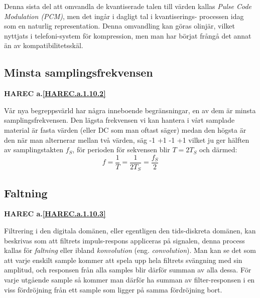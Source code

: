 Denna sista del att omvandla de kvantiserade talen till värden kallas
\emph{Pulse Code Modulation (PCM)}, men det ingår i dagligt tal i kvantiserings-
processen idag som en naturlig representation.
Denna omvandling kan göras olinjär, vilket nyttjats i telefoni-system för
kompression, men man har börjat frångå det annat än av kompatibilitetsskäl.

\subsection{Minsta samplingsfrekvensen}
\textbf{HAREC a.\ref{HAREC.a.1.10.2}\label{myHAREC.a.1.10.2}}


Vår nya begreppsvärld har några inneboende begränsningar, en av dem är minsta
samplingsfrekvensen.
Den lägsta frekvensen vi kan hantera i vårt samplade material är fasta värden
(eller DC som man oftast säger) medan den högsta är den när man alternerar
mellan två värden, säg -1 +1 -1 +1 vilket ju ger hälften av samplingstakten
\(f_S\), för perioden för sekvensen blir \(T = 2T_S\) och därmed:
\[
f=\frac{1}{T}=\frac{1}{2T_S}=\frac{f_S}{2}
\]

\subsection{Faltning}
\textbf{HAREC a.\ref{HAREC.a.1.10.3}\label{myHAREC.a.1.10.3}}

Filtrering i den digitala domänen, eller egentligen den tids-diskreta domänen,
kan beskrivas som att filtrets impuls-respons appliceras på signalen, denna
process kallas för \emph{faltning} eller ibland \emph{konvolution} (eng.
\emph{convolution}).
Man kan se det som att varje enskilt sample kommer att spela upp hela filtrets
svängning med sin amplitud, och responsen från alla samples blir därför summan
av alla dessa.
För varje utgående sample så kommer man därför ha summan av filter-responsen
i en viss fördröjning från ett sample som ligger på samma fördröjning bort.


